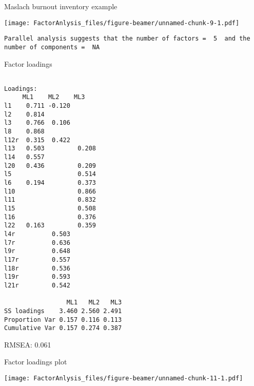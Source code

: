 \documentclass[10pt,ignorenonframetext,]{beamer}
\begin{document}
\begin{frame}[fragile]{Maslach burnout inventory example}

\texttt{[image: FactorAnlysis\_files/figure-beamer/unnamed-chunk-9-1.pdf]}

\begin{verbatim}
Parallel analysis suggests that the number of factors =  5  and the number of components =  NA 
\end{verbatim}

\end{frame}

\begin{frame}[fragile]{Factor loadings}

\tiny

\begin{verbatim}

Loadings:
     ML1    ML2    ML3   
l1    0.711 -0.120       
l2    0.814              
l3    0.766  0.106       
l8    0.868              
l12r  0.315  0.422       
l13   0.503         0.208
l14   0.557              
l20   0.436         0.209
l5                  0.514
l6    0.194         0.373
l10                 0.866
l11                 0.832
l15                 0.508
l16                 0.376
l22   0.163         0.359
l4r          0.503       
l7r          0.636       
l9r          0.648       
l17r         0.557       
l18r         0.536       
l19r         0.593       
l21r         0.542       

                 ML1   ML2   ML3
SS loadings    3.460 2.560 2.491
Proportion Var 0.157 0.116 0.113
Cumulative Var 0.157 0.274 0.387
\end{verbatim}

RMSEA: 0.061

\end{frame}

\begin{frame}{Factor loadings plot}

\texttt{[image: FactorAnlysis\_files/figure-beamer/unnamed-chunk-11-1.pdf]}

\end{frame}
\end{document}

